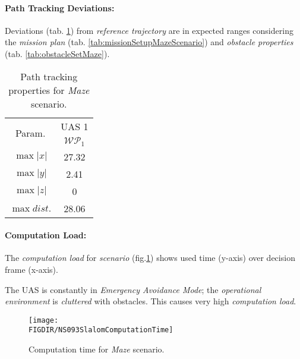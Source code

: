 \paragraph{Path Tracking Deviations:} Deviations (tab. \ref{tab:pathTrackingParametersForMazeAvoidance}) from \emph{reference trajectory} are in expected ranges considering the \emph{mission plan} (tab. \ref{tab:missionSetupMazeScenario}) and \emph{obstacle properties} (tab. \ref{tab:obstacleSetMaze}).

\begin{table}[H]
    \centering
    \begin{tabular}{c||c}
        \multirow{2}{*}{Param.} & UAS 1\\\cline{2-2}
                        & $\mathscr{WP}_1$  \\\hline\hline
          $\max |x|$    & 27.32             \\\hline
          $\max |y|$    & 2.41             \\\hline
          $\max |z|$    & 0                 \\\hline
          $\max dist.$  & 28.06             \\
    \end{tabular}
    \caption{Path tracking properties for \emph{Maze} scenario.}
    \label{tab:pathTrackingParametersForMazeAvoidance}
\end{table}


\paragraph{Computation Load:} The \emph{computation load} for \emph{scenario} (fig.\ref{fig:mazeComputationTime}) shows used time (y-axis) over decision frame (x-axis).

The UAS is constantly in \emph{Emergency Avoidance Mode}; the \emph{operational environment} is \emph{cluttered} with obstacles. This causes very high \emph{computation load}.

\begin{figure}[H]
    \centering
    \texttt{[image: \\FIGDIR/NS093SlalomComputationTime]} 
    \caption{Computation time for \emph{Maze} scenario.}
    \label{fig:mazeComputationTime}
\end{figure}


